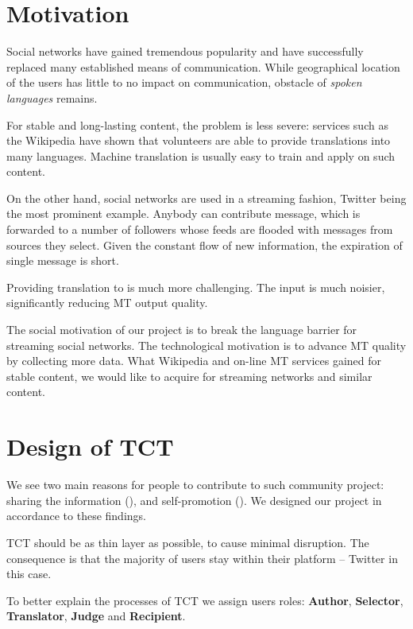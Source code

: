 \documentclass[11pt]{article}
\begin{document}
\section{Motivation}
\label{motiv}

Social networks have gained tremendous popularity and 
have successfully replaced many established means of communication. 
While geographical location of the users has little to no impact on 
communication, obstacle of \emph{spoken languages} remains.

For stable and long-lasting content, the problem is less severe:
services such as the Wikipedia have shown that
volunteers are able to provide translations into many languages. 
Machine translation is usually easy to train and apply on such
content.

On the other hand, social networks are used in a streaming fashion, Twitter
being the most prominent example. Anybody can contribute message, 
which is forwarded to a number of followers whose feeds are flooded 
with messages from sources they select. Given the constant flow
of new information, the expiration of single message is short.

Providing translation to  is much more challenging.
The input is much noisier, significantly reducing MT output quality. 

The social motivation of our project is to break the language
barrier for streaming social networks. The technological motivation is to
advance MT quality by collecting more data.
What Wikipedia and on-line MT services gained for stable content,
we would like to acquire for streaming networks and similar content.

\section{Design of TCT}
\label{design}

We see two main reasons for people to 
contribute to such community project: sharing the information 
(), 
and self-promotion
().
We designed our project in accordance to these findings.

TCT should be as thin layer as possible, to cause 
minimal disruption. The consequence is
that the majority of users stay within their platform -- Twitter in this
case.

To better explain the processes of TCT we assign users roles: 
\textbf{Author}, \textbf{Selector}, \textbf{Translator}, \textbf{Judge} 
and \textbf{Recipient}.
\end{document}
